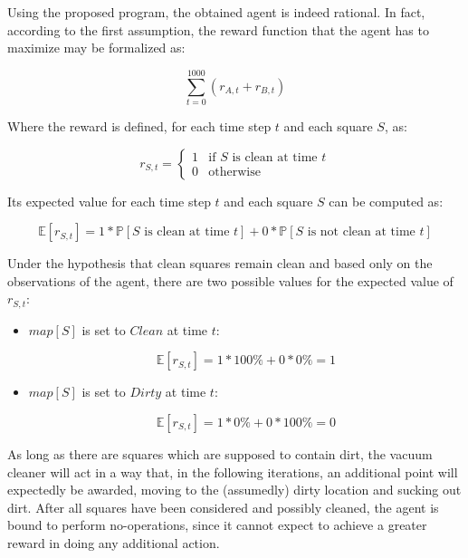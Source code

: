 \documentclass[letterpaper,headings=standardclasses]{scrartcl}
\begin{document}
Using the proposed program, the obtained agent is indeed rational. In fact, according to the first assumption, the reward function that the agent has to maximize may be formalized as:

$$ \sum_{t=0}^{1000} \left( r_{A,t} + r_{B,t} \right) $$

Where the reward is defined, for each time step $t$ and each square $S$, as:

$$ r_{S,t} = \begin{cases} 1 & \text{if } S \text{ is clean at time } t \\ 0 & \text{otherwise} \end{cases}$$

Its expected value for each time step $t$ and each square $S$ can be computed as:

$$ \mathbb{E} \left[ r_{S,t} \right] = 1 * \mathbb{P} \left[ S \text{ is clean at time } t \right] + 0 * \mathbb{P} \left[ S \text{ is not clean at time } t \right] $$

Under the hypothesis that clean squares remain clean and based only on the observations of the agent, there are two possible values for the expected value of $r_{S,t}$:

\begin{itemize}

\item $map[S]$ is set to $Clean$ at time $t$:

$$ \mathbb{E} \left[ r_{S,t} \right] = 1 * 100\% + 0 * 0\% = 1 $$

\item $map[S]$ is set to $Dirty$ at time $t$:

$$ \mathbb{E} \left[ r_{S,t} \right] = 1 * 0\% + 0 * 100\% = 0 $$

\end{itemize}

As long as there are squares which are supposed to contain dirt, the vacuum cleaner will act in a way that, in the following iterations, an additional point will expectedly be awarded, moving to the (assumedly) dirty location and sucking out dirt. After all squares have been considered and possibly cleaned, the agent is bound to perform no-operations, since it cannot expect to achieve a greater reward in doing any additional action.
\end{document}
